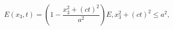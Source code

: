 \begin{equation}
\label{Eq_0610}
E(x_3, t) = \left( 1 - \frac{x^2_3 + (ct)^2}{a^2} \right) E,
  x^2_3 + (ct)^2 \le a^2,
\end{equation}

